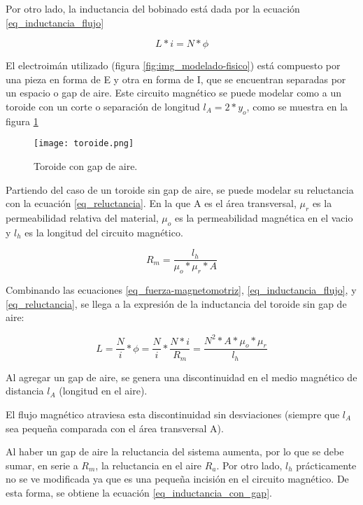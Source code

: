 \noindent Por otro lado, la inductancia del bobinado está dada por la ecuación \ref{eq_inductancia_flujo}

\begin{equation} \label{eq_inductancia_flujo}
	L*i=N*\phi
\end{equation}


\noindent El electroimán utilizado (figura \ref{fig:img_modelado-fisico}) está compuesto por una pieza en forma de E y otra en forma de I, que se encuentran separadas por un espacio o gap de aire. Este circuito magnético se puede modelar como a un toroide con un corte o separación  de longitud $l_{A}=2*y_{o}$, como se muestra en la figura \ref{fig:img_toroide}

\begin{figure}[H]
	\centering
	\texttt{[image: toroide.png]}
	\caption{Toroide con gap de aire.}
	\label{fig:img_toroide}
\end{figure}

\noindent Partiendo del caso de un toroide sin gap de aire, se puede modelar su reluctancia con la ecuación \ref{eq_reluctancia}. En la que A es el área transversal, $\mu_{r}$ es la permeabilidad relativa del material, $\mu_{o}$ es la permeabilidad magnética en el vacio y $l_{h}$ es la longitud del circuito magnético. 

\begin{equation}\label{eq_reluctancia}
	R_{m}=\frac{l_{h}}{\mu_{o}*\mu_{r}*A}
\end{equation}

\noindent Combinando las ecuaciones \ref{eq_fuerza-magnetomotriz}, \ref{eq_inductancia_flujo}, y \ref{eq_reluctancia}, se llega a la expresión de la inductancia del toroide sin gap de aire:

\begin{equation}\label{eq_inductancia}
	L=\frac{N}{i}*\phi=\frac{N}{i}*\frac{N*i}{R_{m}}=\frac{N^	{2}*A*\mu_{o}*\mu_{r}}{l_{h}}
\end{equation}


\noindent Al agregar un gap de aire, se genera una discontinuidad en el medio magnético de distancia $l_{A}$ (longitud en el aire).

\noindent El flujo magnético atraviesa esta discontinuidad sin desviaciones (siempre que $l_{A}$ sea pequeña comparada con el área transversal A).

\noindent Al haber un gap de aire la reluctancia del sistema aumenta, por lo que se debe sumar, en serie a $R_{m}$, la reluctancia en el aire $R_{a}$. Por otro lado, $l_{h}$ prácticamente no se ve modificada ya que es una pequeña incisión en el circuito magnético. De esta forma, se obtiene la ecuación \ref{eq_inductancia_con_gap}.


